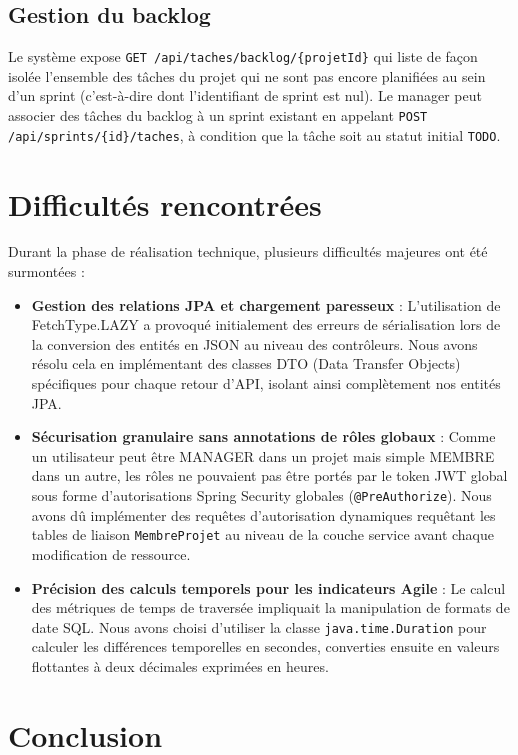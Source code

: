 \documentclass[12pt,a4paper]{report}
\begin{document}
\subsection{Gestion du backlog}
Le système expose \verb|GET /api/taches/backlog/{projetId}| qui liste de façon isolée l'ensemble des tâches du projet qui ne sont pas encore planifiées au sein d'un sprint (c'est-à-dire dont l'identifiant de sprint est nul). Le manager peut associer des tâches du backlog à un sprint existant en appelant \verb|POST /api/sprints/{id}/taches|, à condition que la tâche soit au statut initial \verb|TODO|.

\section{Difficultés rencontrées}

Durant la phase de réalisation technique, plusieurs difficultés majeures ont été surmontées :
\begin{itemize}
\item \textbf{Gestion des relations JPA et chargement paresseux} : L'utilisation de FetchType.LAZY a provoqué initialement des erreurs de sérialisation lors de la conversion des entités en JSON au niveau des contrôleurs. Nous avons résolu cela en implémentant des classes DTO (Data Transfer Objects) spécifiques pour chaque retour d'API, isolant ainsi complètement nos entités JPA.
\item \textbf{Sécurisation granulaire sans annotations de rôles globaux} : Comme un utilisateur peut être MANAGER dans un projet mais simple MEMBRE dans un autre, les rôles ne pouvaient pas être portés par le token JWT global sous forme d'autorisations Spring Security globales (\verb|@PreAuthorize|). Nous avons dû implémenter des requêtes d'autorisation dynamiques requêtant les tables de liaison \verb|MembreProjet| au niveau de la couche service avant chaque modification de ressource.
\item \textbf{Précision des calculs temporels pour les indicateurs Agile} : Le calcul des métriques de temps de traversée impliquait la manipulation de formats de date SQL. Nous avons choisi d'utiliser la classe \verb|java.time.Duration| pour calculer les différences temporelles en secondes, converties ensuite en valeurs flottantes à deux décimales exprimées en heures.
\end{itemize}

\section{Conclusion}
\end{document}
